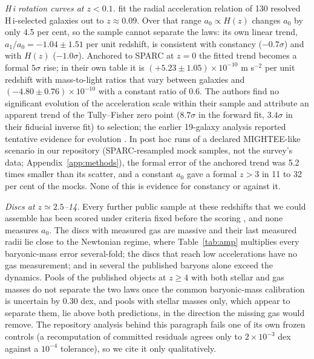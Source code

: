 \documentclass[fleqn,usenatbib]{mnras}
\begin{document}
\emph{H\,{\sc i} rotation curves at $z<0.1$.} \citet{Varasteanu2026} fit the radial acceleration relation of 130 resolved H\,{\sc i}-selected galaxies out to $z\approx0.09$. Over that range $a_0\propto H(z)$ changes $a_0$ by only 4.5 per cent, so the sample cannot separate the laws: its own linear trend, $a_1/a_0=-1.04\pm1.51$ per unit redshift, is consistent with constancy ($-0.7\sigma$) and with $H(z)$ ($-1.0\sigma$). Anchored to SPARC at $z=0$ the fitted trend becomes a formal $5\sigma$ rise; in their own table it is $(+5.23\pm1.05)\times10^{-10}$ m s$^{-2}$ per unit redshift with mass-to-light ratios that vary between galaxies and $(-4.80\pm0.76)\times10^{-10}$ with a constant ratio of 0.6. The authors find no significant evolution of the acceleration scale within their sample and attribute an apparent trend of the Tully--Fisher zero point ($8.7\sigma$ in the forward fit, $3.4\sigma$ in their fiducial inverse fit) to selection; the earlier 19-galaxy analysis reported tentative evidence for evolution \citep{Varasteanu2025}. In post hoc runs of a declared MIGHTEE-like scenario in our repository (SPARC-resampled mock samples, not the survey's data; Appendix~\ref{app:methods}), the formal error of the anchored trend was 5.2 times smaller than its scatter, and a constant $a_0$ gave a formal $z>3$ in 11 to 32 per cent of the mocks. None of this is evidence for constancy or against it.

\emph{Discs at $z\simeq2.5$--14.} Every further public sample at these redshifts that we could assemble has been scored under criteria fixed before the scoring \citep{Zimmerman2026wall}, and none measures $a_0$. The discs with measured gas are massive and their last measured radii lie close to the Newtonian regime, where Table~\ref{tab:amp} multiplies every baryonic-mass error several-fold; the discs that reach low accelerations have no gas measurement; and in several the published baryons alone exceed the dynamics. Pools of the published objects at $z\geq4$ with both stellar and gas masses do not separate the two laws once the common baryonic-mass calibration is uncertain by 0.30 dex, and pools with stellar masses only, which appear to separate them, lie above both predictions, in the direction the missing gas would remove. The repository analysis behind this paragraph fails one of its own frozen controls (a recomputation of committed residuals agrees only to $2\times10^{-3}$ dex against a $10^{-4}$ tolerance), so we cite it only qualitatively.
\end{document}
